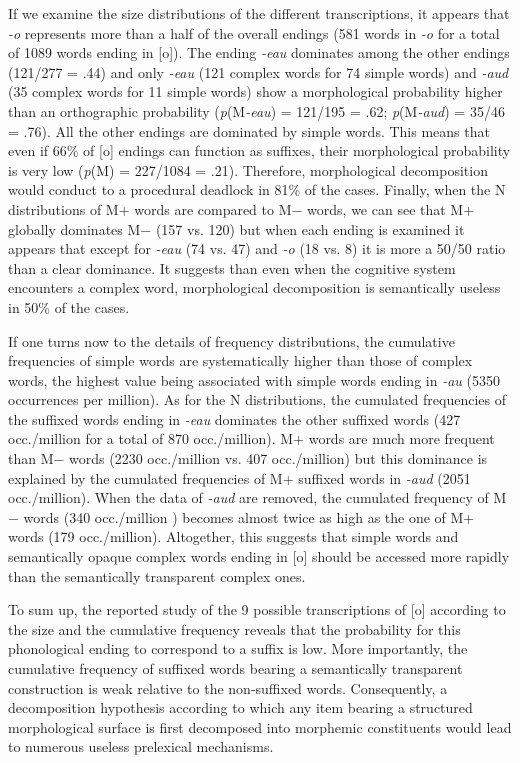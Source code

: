 \documentclass[output=paper]{langsci/langscibook}
\begin{document}
If we examine the size distributions of the different transcriptions, it
appears that \emph{-o} represents more than a half of the overall
endings (581 words in \emph{-o} for a total of 1089 words ending in
{[}o{]}). The ending \emph{-eau} dominates among the other endings
(121/277 = .44) and only \emph{-eau} (121 complex words for 74 simple
words) and \emph{-aud} (35 complex words for 11 simple words) show a
morphological probability higher than an orthographic probability
(\emph{p}(M\emph{-eau}) = 121/195 = .62; \emph{p}(M\emph{-aud}) = 35/46
= .76). All the other endings are dominated by simple words. This means
that even if 66\% of {[}o{]} endings can function as suffixes, their
morphological probability is very low (\emph{p}(M) = 227/1084 = .21).
Therefore, morphological decomposition would conduct to a procedural
deadlock in 81\% of the cases. Finally, when the N distributions of M+
words are compared to M$-$ words, we can see that M+ globally dominates M$-$
(157 vs. 120) but when each ending is examined it appears that except
for \emph{-eau} (74 vs. 47) and \emph{-o} (18 vs. 8) it is more a
50/50 ratio than a clear dominance. It suggests than even when the
cognitive system encounters a complex word, morphological decomposition
is semantically useless in 50\% of the cases.

If one turns now to the details of frequency distributions, the
cumulative frequencies of simple words are systematically higher than
those of complex words, the highest value being associated with simple
words ending in \emph{-au} (5350 occurrences per million). As for the N
distributions, the cumulated frequencies of the suffixed words ending in
\emph{-eau} dominates the other suffixed words (427 occ./million for a
total of 870 occ./million). M+ words are much more frequent than M$-$
words (2230 occ./million vs. 407 occ./million) but this dominance is
explained by the cumulated frequencies of M+ suffixed words in
\emph{-aud} (2051 occ./million). When the data of \emph{-aud} are
removed, the cumulated frequency of M$-$ words (340 occ./million ) becomes
almost twice as high as the one of M+ words (179 occ./million).
Altogether, this suggests that simple words and semantically opaque
complex words ending in {[}o{]} should be accessed more rapidly than the
semantically transparent complex ones.

To sum up, the reported study of the 9 possible transcriptions of
{[}o{]} according to the size and the cumulative frequency reveals that
the probability for this phonological ending to correspond to a suffix
is low. More importantly, the cumulative frequency of suffixed words
bearing a semantically transparent construction is weak relative to the
non-suffixed words. Consequently, a decomposition hypothesis according
to which any item bearing a structured morphological surface is first
decomposed into morphemic constituents would lead to numerous useless
prelexical mechanisms.
\end{document}
